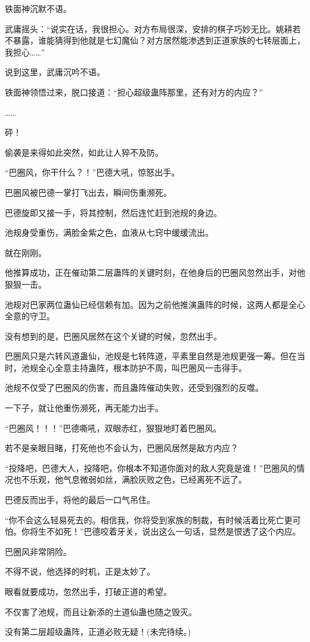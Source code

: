 \begin{this_body}
铁面神沉默不语。

武庸摇头：“说实在话，我很担心。对方布局很深，安排的棋子巧妙无比。姚耕若不暴露，谁能猜得到他就是七幻魔仙？对方居然能渗透到正道家族的七转层面上，我担心……”

说到这里，武庸沉吟不语。

铁面神领悟过来，脱口接道：“担心超级蛊阵那里，还有对方的内应？”

……

砰！

偷袭是来得如此突然，如此让人猝不及防。

“巴圈风，你干什么？！”巴德大吼，惊怒出手。

巴圈风被巴德一掌打飞出去，瞬间伤重濒死。

巴德旋即又接一手，将其控制，然后连忙赶到池规的身边。

池规身受重伤，满脸金紫之色，血液从七窍中缓缓流出。

就在刚刚。

他推算成功，正在催动第二层蛊阵的关键时刻，在他身后的巴圈风忽然出手，对他狠狠一击。

池规对巴家两位蛊仙已经信赖有加。因为之前他推演蛊阵的时候，这两人都是全心全意的守卫。

没有想到的是，巴圈风居然在这个关键的时候，忽然出手。

巴圈风只是六转风道蛊仙，池规是七转阵道，平素里自然是池规更强一筹。但在当时，池规全心全意主持蛊阵，根本防护不周，叫巴圈风一击得手。

池规不仅受了巴圈风的伤害，而且蛊阵催动失败，还受到强烈的反噬。

一下子，就让他重伤濒死，再无能力出手。

“巴圈风！！！”巴德嘶吼，双眼赤红，狠狠地盯着巴圈风。

若不是亲眼目睹，打死他也不会认为，巴圈风居然是敌方内应？

“投降吧，巴德大人，投降吧，你根本不知道你面对的敌人究竟是谁！”巴圈风的情况也不乐观，他气息微弱如丝，满脸灰败之色，已经离死不远了。

巴德反而出手，将他的最后一口气吊住。

“你不会这么轻易死去的。相信我，你将受到家族的制裁，有时候活着比死亡更可怕。你将生不如死！”巴德咬着牙关，说出这么一句话，显然是恨透了这个内应。

巴圈风非常阴险。

不得不说，他选择的时机，正是太妙了。

眼看就要成功，忽然出手，打破正道的希望。

不仅害了池规，而且让新添的土道仙蛊也随之毁灭。

没有第二层超级蛊阵，正道必败无疑！(未完待续。)

\end{this_body}


